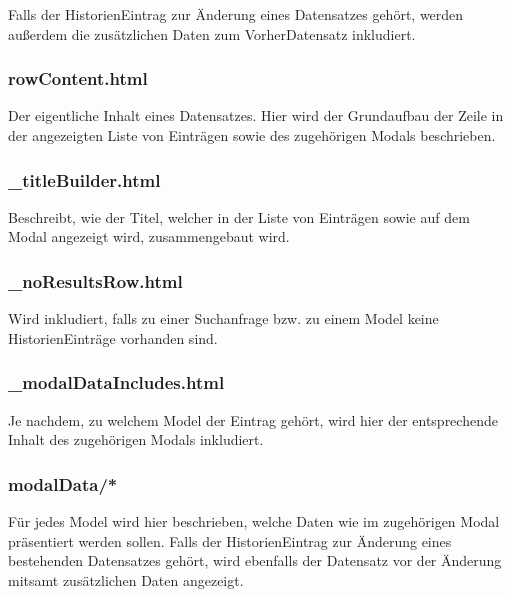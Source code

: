 \documentclass[letterpaper,10pt,english]{sphinxmanual}
\begin{document}
\begin{DUlineblock}{0em}
\item[] Falls der Historien\sphinxhyphen{}Eintrag zur Änderung eines Datensatzes gehört, werden außerdem die zusätzlichen Daten zum Vorher\sphinxhyphen{}Datensatz inkludiert.
\end{DUlineblock}


\subsubsection{rowContent.html}
\label{\detokenize{masterCodeDoc:rowcontent-html}}
Der eigentliche Inhalt eines Datensatzes. Hier wird der Grundaufbau der Zeile in der angezeigten Liste von Einträgen sowie des zugehörigen Modals beschrieben.


\subsubsection{\_titleBuilder.html}
\label{\detokenize{masterCodeDoc:titlebuilder-html}}
Beschreibt, wie der Titel, welcher in der Liste von Einträgen sowie auf dem Modal angezeigt wird, zusammengebaut wird.


\subsubsection{\_noResultsRow.html}
\label{\detokenize{masterCodeDoc:noresultsrow-html}}
Wird inkludiert, falls zu einer Suchanfrage bzw. zu einem Model keine Historien\sphinxhyphen{}Einträge vorhanden sind.


\subsubsection{\_modalDataIncludes.html}
\label{\detokenize{masterCodeDoc:modaldataincludes-html}}
Je nachdem, zu welchem Model der Eintrag gehört, wird hier der entsprechende Inhalt des zugehörigen Modals inkludiert.


\subsubsection{modalData/*}
\label{\detokenize{masterCodeDoc:modaldata}}
Für jedes Model wird hier beschrieben, welche Daten wie im zugehörigen Modal präsentiert werden sollen. Falls der Historien\sphinxhyphen{}Eintrag zur Änderung eines bestehenden Datensatzes
gehört, wird ebenfalls der Datensatz vor der Änderung mitsamt zusätzlichen Daten angezeigt.
\end{document}
